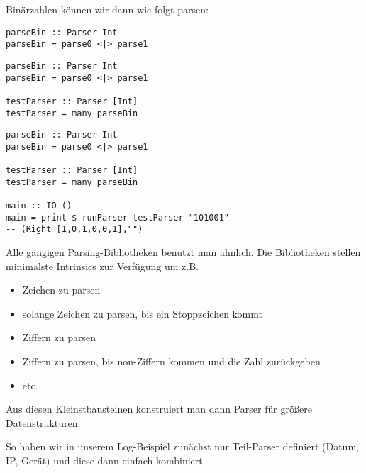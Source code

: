 \documentclass{beamer}
\begin{document}
\begin{frame}[fragile]
Binärzahlen können wir dann wie folgt parsen:\bigskip

\begin{overprint}
\begin{verbatim}
parseBin :: Parser Int
parseBin = parse0 <|> parse1
\end{verbatim}
\begin{verbatim}
parseBin :: Parser Int
parseBin = parse0 <|> parse1

testParser :: Parser [Int]
testParser = many parseBin
\end{verbatim}
\begin{verbatim}
parseBin :: Parser Int
parseBin = parse0 <|> parse1

testParser :: Parser [Int]
testParser = many parseBin

main :: IO ()
main = print $ runParser testParser "101001"
-- (Right [1,0,1,0,0,1],"")
\end{verbatim}
\end{overprint}
\end{frame}

\begin{frame}[fragile]
Alle gängigen Parsing-Bibliotheken benutzt man ähnlich. Die Bibliotheken stellen minimalste Intrinsics zur Verfügung um z.B.
\pause
\begin{itemize}
 \item Zeichen zu parsen
 \pause
 \item solange Zeichen zu parsen, bis ein Stoppzeichen kommt
 \pause
 \item Ziffern zu parsen
 \pause
 \item Ziffern zu parsen, bis non-Ziffern kommen und die Zahl zurückgeben
 \pause
 \item etc.
\end{itemize}
\pause
Aus diesen Kleinstbausteinen konstruiert man dann Parser für größere Datenstrukturen.\\\par
\pause
So haben wir in unserem Log-Beispiel zunächst nur Teil-Parser definiert (Datum, IP, Gerät) und diese dann einfach kombiniert.
\end{frame}
\end{document}

